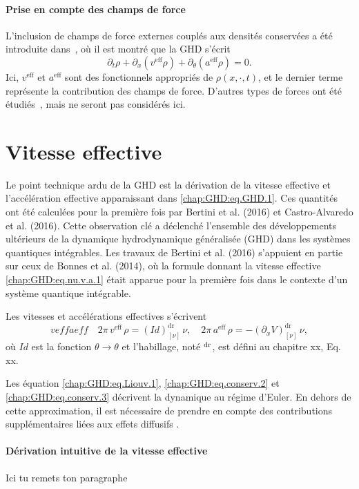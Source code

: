 \paragraph{Prise en compte des champs de force}  
L’inclusion de champs de force externes couplés aux densités conservées a été introduite dans~\cite{ref11}, où il est montré que la GHD s’écrit
\begin{equation}\label{chap:GHD:eq.GHD.1}
	\partial_t \rho + \partial_x(v^{\text{eff}} \rho) + \partial_\theta(a^{\text{eff}} \rho) = 0.
\end{equation}
Ici, $v^{\text{eff}}$ et $a^{\text{eff}}$ sont des fonctionnels appropriés de $\rho(x,\cdot,t)$, et le dernier terme représente la contribution des champs de force. D’autres types de forces ont été étudiés~\cite{Bastianello2019a,Bastianello2019b}, mais ne seront pas considérés ici.

{\color{blue}
  \section{Vitesse effective}
  Le point technique ardu de la GHD est la dérivation de  la vitesse effective et l'accélération effective apparaissant dans \eqref{chap:GHD:eq.GHD.1}.
Ces quantités ont été calculées 
pour la première fois par Bertini et al. (2016) et Castro-Alvaredo et al. (2016). Cette observation clé a déclenché l’ensemble des développements ultérieurs de la dynamique hydrodynamique généralisée (GHD) dans les systèmes quantiques intégrables. Les travaux de Bertini et al. (2016) s’appuient en partie sur ceux de Bonnes et al. (2014), où la formule donnant la vitesse effective \eqref{chap:GHD:eq.nu.v.a.1} était apparue pour la première fois dans le contexte d’un système quantique intégrable.

  Les vitesses et accélérations effectives s'écrivent
  \begin{equation}%
    veff
    aeff
	\quad 2 \pi \, v^{\mathrm{eff}} \, \rho  =(Id )^{\mathrm{dr}}_{[\nu]} \, \nu , 
	\quad 2 \pi \, a^{\mathrm{eff}} \, \rho  = -(\partial_x V )^{\mathrm{dr}}_{[\nu]}\, \nu ,
\end{equation}
où $Id$ est la fonction $\theta \rightarrow \theta$ et l'habillage, noté $^{\rm dr}$, est défini au chapitre xx, Eq. xx. 


Les équation \eqref{chap:GHD:eq.Liouv.1},  \eqref{chap:GHD:eq.conserv.2} et \eqref{chap:GHD:eq.conserv.3} décrivent la dynamique au régime d’Euler. En dehors de cette approximation, il est nécessaire de prendre en compte des contributions supplémentaires liées aux effets diffusifs \cite{DeNardis2018}.

\paragraph{Dérivation intuitive de la vitesse effective}
Ici tu remets ton paragraphe
}


